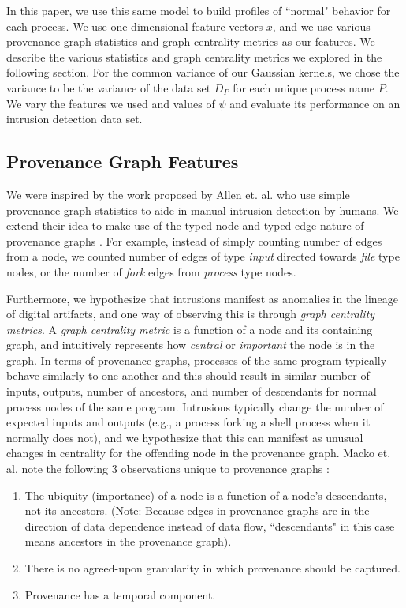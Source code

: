 \documentclass[10pt,twocolumn]{article}
\begin{document}
In this paper, we use this same model to build profiles of ``normal" behavior for each process. We use
one-dimensional feature vectors $x$, and we use various provenance graph statistics and graph
centrality metrics as our features. We describe the various statistics and graph centrality metrics we explored
in the following section. For the common variance of our Gaussian kernels, we chose
the variance to be the variance of the data set $D_P$ for each unique process name $P$. 
We vary the features we used and values of $\psi$ and evaluate its performance on an intrusion detection data set.

\subsection{Provenance Graph Features}

We were inspired by the work proposed by Allen et. al. who use simple provenance graph statistics to aide
in manual intrusion detection by humans. We extend their idea to make use of the typed node and typed edge
nature of provenance graphs \cite{provstat}. For example, instead of simply counting number of edges from a node, we
counted number of edges of type {\em input} directed towards {\em file} type nodes, or the number of {\em fork}
edges from {\em process} type nodes.

Furthermore, we hypothesize that intrusions manifest as anomalies in the lineage of digital artifacts, and
one way of observing this is through {\em graph centrality metrics}. A {\em graph centrality metric} is a function
of a node and its containing graph, and intuitively represents how {\em central} or {\em important} the node
is in the graph. In terms of provenance graphs, processes of the same program typically behave similarly to one another
and this should result in similar number of inputs, outputs, number of ancestors, and number of descendants for normal
process nodes of the same program.
Intrusions typically change the number of expected inputs and outputs (e.g., a process forking a shell process
when it normally does not), and we hypothesize that this can manifest as unusual changes in centrality
for the offending node in the provenance graph. Macko et. al. note the following 3 observations unique to provenance graphs \cite{clustering}:
\begin{enumerate}
\item The ubiquity (importance) of a node is a function of a node's descendants, not its ancestors. (Note: Because edges in provenance graphs are in the direction of data dependence instead of data flow, ``descendants" in this case means ancestors in the provenance graph).
\item There is no agreed-upon granularity in which provenance should be captured.
\item Provenance has a temporal component.
\end{enumerate}
\end{document}
